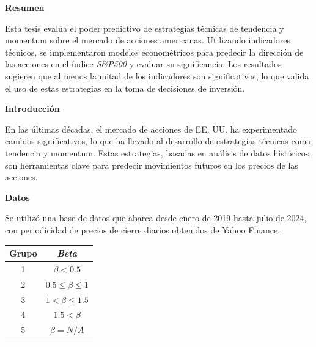 \documentclass[a0,portrait]{a0poster}
\newcommand{\customsection}[1]{
    \begin{center}
        \begin{tcolorbox}[colframe=miRojo!50, colback=miRojo, width=\linewidth, boxrule=1mm, arc=3mm, auto outer arc]
            \centering
            \vspace{.5cm} %
            \color{white}
            \textbf{\Huge #1}
            \color{miRojo}
            \vspace{.5cm} %
        \end{tcolorbox}
    \end{center}
}
\begin{document}
\vspace{2cm}
\normalsize %
\begin{multicols}{2}

    \customsection{Resumen}
    \par
    \normalsize
    Esta tesis evalúa el poder predictivo de estrategias técnicas de tendencia y momentum sobre el mercado de acciones americanas.
     Utilizando indicadores técnicos, se implementaron modelos econométricos para predecir la dirección de las acciones en el 
     índice \textit{S\&P500} y evaluar su significancia. Los resultados sugieren que al menos la mitad de los indicadores son significativos, lo que valida el uso 
     de estas estrategias en la toma de decisiones de inversión.
    
    \customsection{Introducción}
    \par
     En las últimas décadas, el mercado de acciones de EE. UU. ha experimentado cambios significativos, lo que ha llevado al
      desarrollo de estrategias técnicas como tendencia y momentum. Estas estrategias, basadas en análisis de datos históricos, 
      son herramientas clave para predecir movimientos futuros en los precios de las acciones.
    \customsection{Datos}
    \par
    Se utilizó una base de datos que abarca desde enero de 2019 hasta julio de 2024, con periodicidad de precios de cierre 
    diarios obtenidos de Yahoo Finance.\\
    \begin{minipage}{,984\linewidth}
        \centering
        \vspace{1cm}
        \begin{tabular}{cc}
            \toprule
            \textbf{Grupo} & \textbf{\textit{Beta}}  \\
            \midrule
            1   &  $\beta < 0.5$                      \\
            2       & $0.5 \leq \beta \leq 1$    \\
            3      & $1 < \beta \leq 1.5$    \\
            4       & $1.5 < \beta $    \\
            5       & $\beta =N/A$    \\
            \bottomrule
            \vspace{.5cm}

\end{tabular}
\end{minipage}
\end{multicols}
\end{document}
